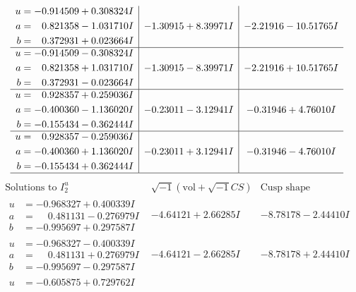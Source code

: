 \documentclass[1p]{elsarticle_modified}
\theoremstyle{definition}
\newcommand{\I}{\sqrt{-1}}
\begin{document}
$$\begin{array}{c|c|c}
\begin{aligned}
u &= -0.914509 + 0.308324 I \\
a &= \phantom{-}0.821358 - 1.031710 I \\
b &= \phantom{-}0.372931 + 0.023664 I\end{aligned}
 & -1.30915 + 8.39971 I & -2.21916 - 10.51765 I \\ \hline\begin{aligned}
u &= -0.914509 - 0.308324 I \\
a &= \phantom{-}0.821358 + 1.031710 I \\
b &= \phantom{-}0.372931 - 0.023664 I\end{aligned}
 & -1.30915 - 8.39971 I & -2.21916 + 10.51765 I \\ \hline\begin{aligned}
u &= \phantom{-}0.928357 + 0.259036 I \\
a &= -0.400360 - 1.136020 I \\
b &= -0.155434 - 0.362444 I\end{aligned}
 & -0.23011 - 3.12941 I & -0.31946 + 4.76010 I \\ \hline\begin{aligned}
u &= \phantom{-}0.928357 - 0.259036 I \\
a &= -0.400360 + 1.136020 I \\
b &= -0.155434 + 0.362444 I\end{aligned}
 & -0.23011 + 3.12941 I & -0.31946 - 4.76010 I\\
 \hline 
 \end{array}$$\newpage$$\begin{array}{c|c|c}  
\text{Solutions to }I^u_{2}& \I (\text{vol} + \sqrt{-1}CS) & \text{Cusp shape}\\
 \hline 
\begin{aligned}
u &= -0.968327 + 0.400339 I \\
a &= \phantom{-}0.481131 - 0.276979 I \\
b &= -0.995697 + 0.297587 I\end{aligned}
 & -4.64121 + 2.66285 I & -8.78178 - 2.44410 I \\ \hline\begin{aligned}
u &= -0.968327 - 0.400339 I \\
a &= \phantom{-}0.481131 + 0.276979 I \\
b &= -0.995697 - 0.297587 I\end{aligned}
 & -4.64121 - 2.66285 I & -8.78178 + 2.44410 I \\ \hline\begin{aligned}
u &= -0.605875 + 0.729762 I \\

\end{aligned}
\end{array}$$
\end{document}
